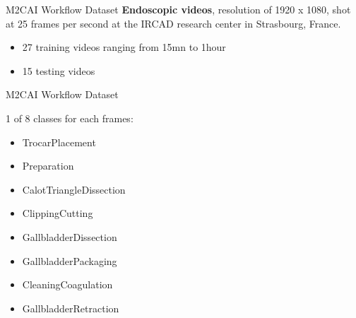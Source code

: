 \begin{frame}{M2CAI Workflow Dataset}
	\textbf{Endoscopic videos}, resolution of 1920 x 1080, shot at 25 frames per second at the IRCAD research center in Strasbourg, France.
	
	\begin{itemize}
		\item 27 training videos ranging from 15mn to 1hour%
		\item 15 testing videos %
	\end{itemize}
	
\end{frame}

\begin{frame}{M2CAI Workflow Dataset}

	1 of 8 classes for each frames:
	\begin{itemize}
		\item TrocarPlacement
		\item Preparation
		\item CalotTriangleDissection
       	\item ClippingCutting
       	\item GallbladderDissection
       	\item GallbladderPackaging
       	\item CleaningCoagulation
       	\item GallbladderRetraction
    \end{itemize}

\end{frame}

